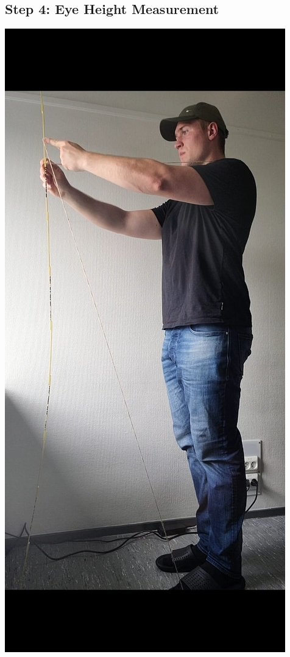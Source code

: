 \documentclass[11pt,a4paper]{article}
\begin{document}
\subsection{Step 4: Eye Height Measurement}
\begin{multicols}{2}
    \includegraphics[width=\linewidth]{measure2.jpg}
    

\end{multicols}
\end{document}
